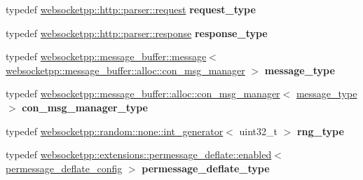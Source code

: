 \begin{DoxyCompactItemize}
\item 
typedef \hyperlink{classwebsocketpp_1_1http_1_1parser_1_1request}{websocketpp\+::http\+::parser\+::request} {\bfseries request\+\_\+type}\hypertarget{structstub__config__ext_a7d918055368df24ac5abc2ec695f2337}{}\label{structstub__config__ext_a7d918055368df24ac5abc2ec695f2337}

\item 
typedef \hyperlink{classwebsocketpp_1_1http_1_1parser_1_1response}{websocketpp\+::http\+::parser\+::response} {\bfseries response\+\_\+type}\hypertarget{structstub__config__ext_abfbba32dd761354bcc689014cd054a80}{}\label{structstub__config__ext_abfbba32dd761354bcc689014cd054a80}

\item 
typedef \hyperlink{classwebsocketpp_1_1message__buffer_1_1message}{websocketpp\+::message\+\_\+buffer\+::message}$<$ \hyperlink{classwebsocketpp_1_1message__buffer_1_1alloc_1_1con__msg__manager}{websocketpp\+::message\+\_\+buffer\+::alloc\+::con\+\_\+msg\+\_\+manager} $>$ {\bfseries message\+\_\+type}\hypertarget{structstub__config__ext_a94688e37cfadde39cd35d28bc42204b6}{}\label{structstub__config__ext_a94688e37cfadde39cd35d28bc42204b6}

\item 
typedef \hyperlink{classwebsocketpp_1_1message__buffer_1_1alloc_1_1con__msg__manager}{websocketpp\+::message\+\_\+buffer\+::alloc\+::con\+\_\+msg\+\_\+manager}$<$ \hyperlink{classwebsocketpp_1_1message__buffer_1_1message}{message\+\_\+type} $>$ {\bfseries con\+\_\+msg\+\_\+manager\+\_\+type}\hypertarget{structstub__config__ext_a8dfac1ea38925de311f58a612c2da629}{}\label{structstub__config__ext_a8dfac1ea38925de311f58a612c2da629}

\item 
typedef \hyperlink{classwebsocketpp_1_1random_1_1none_1_1int__generator}{websocketpp\+::random\+::none\+::int\+\_\+generator}$<$ uint32\+\_\+t $>$ {\bfseries rng\+\_\+type}\hypertarget{structstub__config__ext_a73b73b9c92e656f0fa8a56b5fe4e43b4}{}\label{structstub__config__ext_a73b73b9c92e656f0fa8a56b5fe4e43b4}

\item 
typedef \hyperlink{classwebsocketpp_1_1extensions_1_1permessage__deflate_1_1enabled}{websocketpp\+::extensions\+::permessage\+\_\+deflate\+::enabled}$<$ \hyperlink{structstub__config__ext_1_1permessage__deflate__config}{permessage\+\_\+deflate\+\_\+config} $>$ {\bfseries permessage\+\_\+deflate\+\_\+type}\hypertarget{structstub__config__ext_a4bcc26e234e47e0dced0db671313124e}{}\label{structstub__config__ext_a4bcc26e234e47e0dced0db671313124e}

\end{DoxyCompactItemize}
